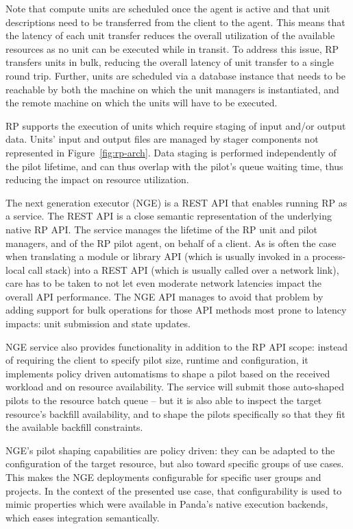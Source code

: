 \documentclass{webofc}
\begin{document}
	Note that compute units are scheduled once the agent is active and that unit descriptions need to be transferred from the client to the agent. This means that the latency of each unit transfer reduces the overall utilization of the available resources as no unit can be executed while in transit. To address this issue, RP transfers units in bulk, reducing the overall latency of unit transfer to a single round trip. Further, units are scheduled via a database instance that needs to be reachable by both the machine on which the unit managers is instantiated, and the remote machine on which the units will have to be executed. 
	
	RP supports the execution of units which require staging of input and/or output data. Units’ input and output files are managed by stager components not represented in Figure~\ref{fig:rp-arch}. Data staging is performed independently of the pilot lifetime, and can thus overlap with the pilot's queue waiting time, thus reducing the impact on resource utilization.
	
	The next generation executor (NGE) is a REST API that enables running RP as a service. The REST API is a close semantic representation of the underlying native RP API.  The service manages the lifetime of the RP unit and pilot managers, and of the RP pilot agent, on behalf of a client. As is often the case when translating a module or library API (which is usually invoked in a process-local call stack) into a REST API (which is usually called over a network link), care has to be taken to not let even moderate network latencies impact the overall API performance.  The NGE API manages to avoid that problem by adding support for bulk operations for those API methods most prone to latency impacts: unit submission and state updates.
	
	NGE service also provides functionality in addition to the RP API scope: instead of requiring the client to specify pilot size, runtime and configuration, it implements policy driven automatisms to shape a pilot based on the received workload and on resource availability.  The service will submit those auto-shaped pilots to the resource batch queue -- but it is also able to inspect the target resource's backfill availability, and to shape the pilots specifically so that they fit the available backfill constraints. 
	
	NGE's pilot shaping capabilities are policy driven: they can be adapted to the configuration of the target resource, but also toward specific groups of use cases. This makes the NGE deployments configurable for specific user groups and projects.  In the context of the presented use case, that configurability is used to mimic properties which were available in Panda's native execution backends, which eases integration semantically.
\end{document}
